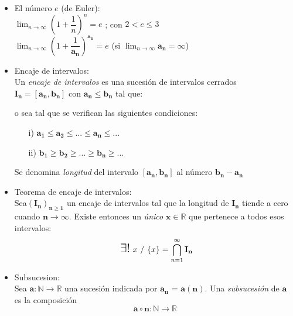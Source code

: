 \documentclass[a4paper,11pt]{report}
\begin{document}
\begin{itemize}
\begin{itemize}
\end{itemize}
\item El número $e$ (de Euler): \\
$\displaystyle \lim_{n\to\infty} (1 + \dfrac{1}{n})^n = e$ ; con $2 < e \leqslant 3$ \\[5pt]
$\displaystyle \lim_{n\to\infty} (1 + \dfrac{1}{\mathbf{a_n}})^{\mathbf{a_n}} = e$ (si $\displaystyle \lim_{n\to\infty} \mathbf{a_n}=\infty$)
\item Encaje de intervalos: \\
Un \emph{encaje de intervalos} es una sucesión de intervalos cerrados $\mathbf{I_n} = \mathbf{[a_n,b_n]} \text{ con } \mathbf{a_n} \leqslant \mathbf{b_n}$ tal que: \\
o sea tal que se verifican las siguientes condiciones: \\
\begin{itemize}
\item[i)]$ \mathbf{a_1} \leqslant \mathbf{a_2} \leqslant ... \leqslant \mathbf{a_n} \leqslant ...$
\item[ii)] $\mathbf{b_1} \geqslant \mathbf{b_2} \geqslant ... \geqslant \mathbf{b_n} \geqslant ...$
\end{itemize}
Se denomina \emph{longitud} del intervalo $\mathbf{[a_n,b_n]}$ al número $\mathbf{b_n} - \mathbf{a_n}$
\item Teorema de encaje de intervalos: \\
Sea$\mathbf{(I_n)_{n \geqslant 1}}$ un encaje de intervalos tal que la longitud de $\mathbf{I_n}$ tiende a cero cuando $\mathbf{n}\to\infty$.
Existe entonces un \emph{único} $\mathbf{x} \in \mathbb{R}$ que pertenece a todos esos intervalos: 
\begin{equation*}
\mbox{  \Large $ \exists ! $} \text{ } x \text{ } / \text{ }\{x\} = \displaystyle \bigcap_{n=1}^\infty \mathbf{I_n}
\end{equation*}
\item Subsucesion: \\
Sea  $\mathbf{a}: \mathbb{N} \longrightarrow \mathbb{R}$ una sucesión indicada por $\mathbf{a_n}$ = $\mathbf{a(n)}$. Una \emph{subsucesión} de $\mathbf{a}$ es la composición
\begin{equation*}
\mathbf{a} \circ \mathbf{n} : \mathbb{N} \to \mathbb{R}

\end{equation*}
\end{itemize}
\end{document}
